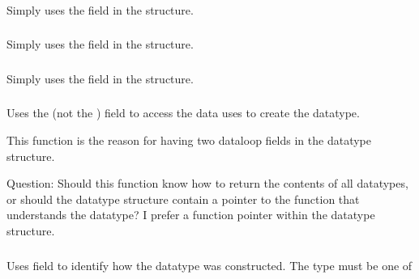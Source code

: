 \documentclass{article}
\begin{document}
\subsubsection{}
Simply uses the  field in the structure.

\subsubsection{}
Simply uses the  field in the structure.

\subsubsection{}
Simply uses the  field in the structure.

\subsubsection{}
Uses the  (not the
) field to access the data uses to
create the datatype. 

This function is the reason for having two dataloop fields in the
datatype structure.  

Question: Should this function know how to return the contents of all
datatypes, or should the datatype structure contain a pointer to the
function that understands the datatype?  
I prefer a function pointer
within the datatype structure.

\subsubsection{}
Uses  field to identify how the datatype was constructed.
The  type must be one of 
\end{document}
